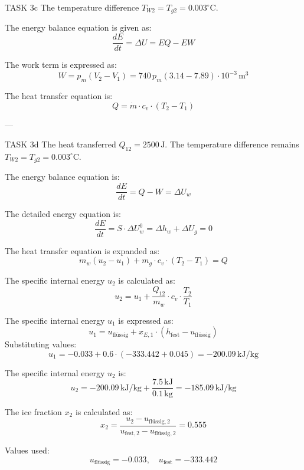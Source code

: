 TASK 3c  
The temperature difference \( T_{W2} = T_{g2} = 0.003^\circ \text{C} \).  

The energy balance equation is given as:  
\[
\frac{dE}{dt} = \Delta U = EQ - EW
\]  

The work term is expressed as:  
\[
W = p_m (V_2 - V_1) = 740 \, p_m (3.14 - 7.89) \cdot 10^{-3} \, \text{m}^3
\]  

The heat transfer equation is:  
\[
Q = \dot{m} \cdot c_v \cdot (T_2 - T_1)
\]  

---

TASK 3d  
The heat transferred \( Q_{12} = 2500 \, \text{J} \).  
The temperature difference remains \( T_{W2} = T_{g2} = 0.003^\circ \text{C} \).  

The energy balance equation is:  
\[
\frac{dE}{dt} = Q - W = \Delta U_w
\]  

The detailed energy equation is:  
\[
\frac{dE}{dt} = S \cdot \Delta U_w^0 = \Delta h_w + \Delta U_g = 0
\]  

The heat transfer equation is expanded as:  
\[
m_w (u_2 - u_1) + m_g \cdot c_v \cdot (T_2 - T_1) = Q
\]  

The specific internal energy \( u_2 \) is calculated as:  
\[
u_2 = u_1 + \frac{Q_{12}}{m_w} \cdot c_v \cdot \frac{T_2}{T_1}
\]  

The specific internal energy \( u_1 \) is expressed as:  
\[
u_1 = u_{\text{flüssig}} + x_{E,1} \cdot (h_{\text{fest}} - u_{\text{flüssig}})
\]  
Substituting values:  
\[
u_1 = -0.033 + 0.6 \cdot (-333.442 + 0.045) = -200.09 \, \text{kJ/kg}
\]  

The specific internal energy \( u_2 \) is:  
\[
u_2 = -200.09 \, \text{kJ/kg} + \frac{7.5 \, \text{kJ}}{0.1 \, \text{kg}} = -185.09 \, \text{kJ/kg}
\]  

The ice fraction \( x_2 \) is calculated as:  
\[
x_2 = \frac{u_2 - u_{\text{flüssig},2}}{u_{\text{fest},2} - u_{\text{flüssig},2}} = 0.555
\]  

Values used:  
\[
u_{\text{flüssig}} = -0.033, \quad u_{\text{fest}} = -333.442
\]  